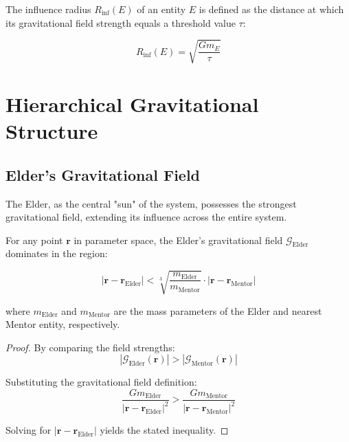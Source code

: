 \begin{definition}
The influence radius $R_{\text{inf}}(E)$ of an entity $E$ is defined as the distance at which its gravitational field strength equals a threshold value $\tau$:

\begin{equation}
R_{\text{inf}}(E) = \sqrt{\frac{G m_E}{\tau}}
\end{equation}
\end{definition}

\section{Hierarchical Gravitational Structure}

\subsection{Elder's Gravitational Field}

The Elder, as the central "sun" of the system, possesses the strongest gravitational field, extending its influence across the entire system.

\begin{theorem}
For any point $\mathbf{r}$ in parameter space, the Elder's gravitational field $\mathcal{G}_{\text{Elder}}$ dominates in the region:

\begin{equation}
|\mathbf{r} - \mathbf{r}_{\text{Elder}}| < \sqrt[3]{\frac{m_{\text{Elder}}}{m_{\text{Mentor}}}} \cdot |\mathbf{r} - \mathbf{r}_{\text{Mentor}}|
\end{equation}

where $m_{\text{Elder}}$ and $m_{\text{Mentor}}$ are the mass parameters of the Elder and nearest Mentor entity, respectively.
\end{theorem}

\begin{proof}
By comparing the field strengths:
\begin{equation}
|\mathcal{G}_{\text{Elder}}(\mathbf{r})| > |\mathcal{G}_{\text{Mentor}}(\mathbf{r})|
\end{equation}

Substituting the gravitational field definition:
\begin{equation}
\frac{G m_{\text{Elder}}}{|\mathbf{r} - \mathbf{r}_{\text{Elder}}|^2} > \frac{G m_{\text{Mentor}}}{|\mathbf{r} - \mathbf{r}_{\text{Mentor}}|^2}
\end{equation}

Solving for $|\mathbf{r} - \mathbf{r}_{\text{Elder}}|$ yields the stated inequality.
\end{proof}

